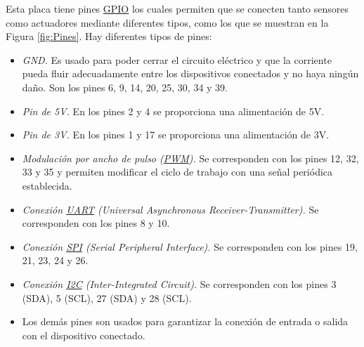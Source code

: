 Esta placa tiene pines \hyperlink{GPIO}{GPIO} los cuales permiten que se conecten tanto sensores como actuadores mediante diferentes tipos, como los que se muestran en la Figura \ref{fig:Pines}. Hay diferentes tipos de pines:

\begin{itemize}
 \item \textit{GND.} Es usado para poder cerrar el circuito eléctrico y que la corriente pueda fluir adecuadamente entre los dispositivos conectados y no haya ningún daño. Son los pines 6, 9, 14, 20, 25, 30, 34 y 39.
 \item \textit{Pin de 5V.} En los pines 2 y 4 se proporciona una alimentación de 5V.
 \item \textit{Pin de 3V.} En los pines 1 y 17 se proporciona una alimentación de 3V.
 \item \textit{Modulación por ancho de pulso (\hyperlink{PWM}{PWM}).} Se corresponden con los pines 12, 32, 33 y 35 y permiten modificar el ciclo de trabajo con una señal periódica establecida.
 \item \textit{Conexión \hyperlink{UART}{UART} (Universal Asynchronous Receiver-Transmitter).} Se corresponden con los pines 8 y 10.
 \item \textit{Conexión \hyperlink{SPI}{SPI} (Serial Peripheral Interface).} Se corresponden con los pines 19, 21, 23, 24 y 26.
 \item \textit{Conexión \hyperlink{I2C}{I2C} (Inter-Integrated Circuit).} Se corresponden con los pines 3 (SDA), 5 (SCL), 27 (SDA) y 28 (SCL).	
 \item \textit{} Los demás pines son usados para garantizar la conexión de entrada o salida con el dispositivo conectado. 
\end{itemize}\

